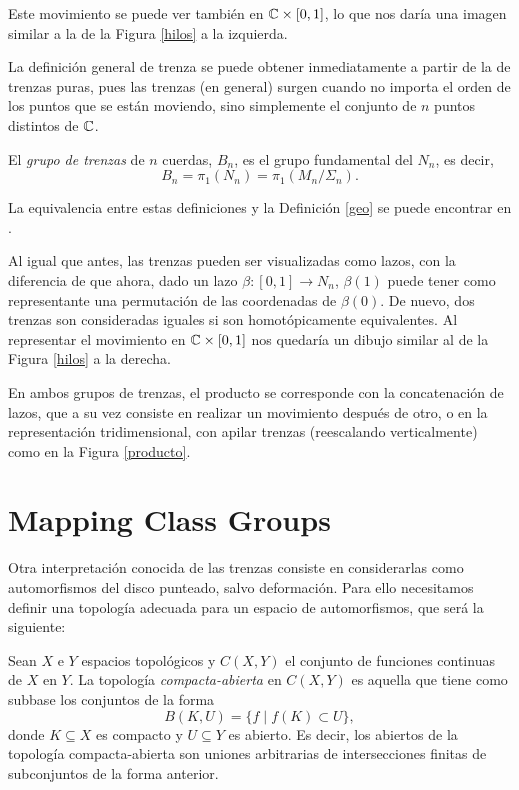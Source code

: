 \documentclass[TFG.tex]{subfiles}
\begin{document}
Este movimiento se puede ver también en $\mathbb{C}\times[0,1]$, lo que nos daría una imagen similar a la de la Figura \ref{hilos} a la izquierda.

La definición general de trenza se puede obtener inmediatamente a partir de la de trenzas puras, pues las trenzas (en general) surgen cuando no importa el orden de los puntos que se están moviendo, sino simplemente el conjunto de $n$ puntos distintos de $\mathbb{C}$.

\begin{defi}
El \emph{grupo de trenzas} de $n$ cuerdas, $B_n$,  es el grupo fundamental del $N_n$, es decir,
$$B_n=\pi_1(N_n)=\pi_1(M_n/\Sigma_n).$$
\end{defi}

La equivalencia entre estas definiciones y la Definición \ref{geo} se puede encontrar en \cite{Zariski}.

Al igual que antes, las trenzas pueden ser visualizadas como lazos, con la diferencia de que ahora, dado un lazo $\beta:[0,1]\to N_n$, $\beta(1)$ puede tener como representante una permutación de las coordenadas de $\beta(0)$. De nuevo, dos trenzas son consideradas iguales si son homotópicamente equivalentes. Al representar el movimiento en $\mathbb{C}\times[0,1]$ nos quedaría un dibujo similar al de la Figura \ref{hilos} a la derecha.

En ambos grupos de trenzas, el producto se corresponde con la concatenación de lazos, que a su vez consiste en realizar un movimiento después de otro, o en la representación tridimensional, con apilar trenzas (reescalando verticalmente) como en la Figura \ref{producto}. 




\section{Mapping Class Groups}

Otra interpretación conocida de las trenzas consiste en considerarlas como automorfismos del disco punteado, salvo deformación. Para ello necesitamos definir una topología adecuada para un espacio de automorfismos, que será la siguiente:

\begin{defi}
Sean $X$ e $Y$ espacios topológicos y $C(X,Y)$ el conjunto de funciones continuas de $X$ en $Y$. La topología \emph{compacta-abierta} en $C(X,Y)$ es aquella que tiene como subbase los conjuntos de la forma
$$B(K,U)=\{f\mid f(K)\subset U\},$$
donde $K\subseteq X$ es compacto y $U\subseteq Y$ es abierto. Es decir, los abiertos de la topología compacta-abierta son uniones arbitrarias de intersecciones finitas de subconjuntos de la forma anterior.
\end{defi}
\end{document}

